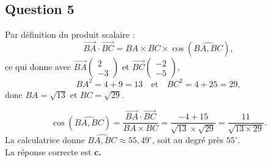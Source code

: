 \subsection*{Question 5}
Par définition du produit scalaire :
	\[ \overrightarrow{BA} \cdot \overrightarrow{BC} = BA \times BC \times \cos(\widehat{BA, BC}), \]
	ce qui donne avec \(\overrightarrow{BA} \left( \begin{array}{c} 2 \\ -3 \end{array} \right)\) et \(\overrightarrow{BC} \left( \begin{array}{c} -2 \\ -5 \end{array} \right)\),
	\[ BA^2 = 4 + 9 = 13 \quad \text{et} \quad BC^2 = 4 + 25 = 29, \]
donc \(BA = \sqrt{13}\) et \(BC = \sqrt{29}\).
	
\[ \cos(\widehat{BA, BC}) = \dfrac{\overrightarrow{BA} \cdot \overrightarrow{BC}}{BA \times BC} = \dfrac{-4 + 15}{\sqrt{13} \times \sqrt{29}} = \dfrac{11}{\sqrt{13 \times 29}}. \]
La calculatrice donne \(\widehat{BA, BC} \approx 55,49^\circ\), soit au degré près $55^\circ$.\\
 La réponse correcte est \textbf{c.}

